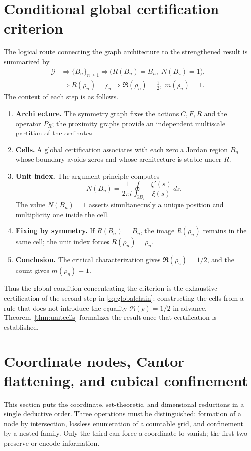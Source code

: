 \documentclass[11pt]{amsart}
\theoremstyle{definition}
\theoremstyle{remark}
\begin{document}
\section{Conditional global certification criterion}\label{sec:globalmechanism}
The logical route connecting the graph architecture to the strengthened result is summarized by
\begin{equation}\label{eq:globalchain}
\boxed{\begin{aligned}
\mathcal G &\Longrightarrow \{B_n\}_{n\ge1}
\Longrightarrow \bigl(R(B_n)=B_n,\;N(B_n)=1\bigr),\\
&\Longrightarrow R(\rho_n)=\rho_n
\Longrightarrow \Re(\rho_n)=\frac12,\;m(\rho_n)=1.
\end{aligned}}
\end{equation}
The content of each step is as follows.
\begin{enumerate}[label=\textbf{G\arabic*.},leftmargin=*]
\item \textbf{Architecture.} The symmetry graph fixes the actions $C,F,R$ and the operator $P_R$; the proximity graphs provide an independent multiscale partition of the ordinates.
\item \textbf{Cells.} A global certification associates with each zero a Jordan region $B_n$ whose boundary avoids zeros and whose architecture is stable under $R$.
\item \textbf{Unit index.} The argument principle computes
\[
N(B_n)=\frac{1}{2\pi i}\oint_{\partial B_n}\frac{\xi'(s)}{\xi(s)}\,ds.
\]
The value $N(B_n)=1$ asserts simultaneously a unique position and multiplicity one inside the cell.
\item \textbf{Fixing by symmetry.} If $R(B_n)=B_n$, the image $R(\rho_n)$ remains in the same cell; the unit index forces $R(\rho_n)=\rho_n$.
\item \textbf{Conclusion.} The critical characterization gives $\Re(\rho_n)=1/2$, and the count gives $m(\rho_n)=1$.
\end{enumerate}
Thus the global condition concentrating the criterion is the exhaustive certification of the second step in \eqref{eq:globalchain}: constructing the cells from a rule that does not introduce the equality $\Re(\rho)=1/2$ in advance. Theorem~\ref{thm:unitcells} formalizes the result once that certification is established.

\section{Coordinate nodes, Cantor flattening, and cubical confinement}
\label{sec:cantor-closure}
This section puts the coordinate, set-theoretic, and dimensional reductions in a single
deductive order.  Three operations must be distinguished: formation of a node by intersection,
lossless enumeration of a countable grid, and confinement by a nested family.  Only the third
can force a coordinate to vanish; the first two preserve or encode information.
\end{document}
